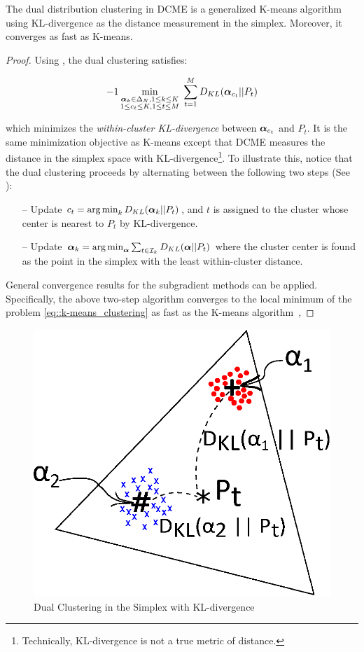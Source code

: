 \begin{thm}
  The dual distribution clustering in DCME is a generalized K-means
  algorithm using KL-divergence as the distance measurement in the simplex.
  Moreover, it converges as fast as K-means.
\end{thm}
\begin{proof}
  Using , the dual clustering satisfies:

  \begin{alignat}{-1}
    \min\limits_{\substack{\valpha_k\in \Delta_N ,  1 \le k \le K \\
                           1 \le c_t \le K , 1 \le t \le M}} \;
  \sum\limits_{t=1}^M D_{KL}(\valpha_{c_t} || P_t) \label{eq::k-means_clustering}
  \end{alignat}

  which minimizes the \emph{within-cluster KL-divergence} between
  $\boldsymbol{\alpha}_{c_t}$ and $P_t$. It is the same minimization objective as K-means
  except that DCME measures the distance in the simplex space with
  KL-divergence\footnote{Technically, KL-divergence is not a true metric of
  distance.}. To illustrate this, notice that the dual clustering proceeds by
  alternating between the following two steps (See ):

\begin{itemize}
\item[--] Update $c_t = \operatorname*{arg\,min}_{k} D_{KL}(\boldsymbol{\alpha}_k || P_t)$, and $t$ is
  assigned to the cluster whose center is nearest to $P_t$ by KL-divergence.
\item[--] Update $\boldsymbol{\alpha}_k = \operatorname*{arg\,min}_{\boldsymbol{\alpha}} \sum_{t \in \mathcal{I}_k} D_{KL}(
  \boldsymbol{\alpha} || P_t)$ where the cluster center is found as the point in the simplex
  with the least within-cluster distance.
\end{itemize}

General convergence results for the subgradient methods can be applied.
Specifically, the above two-step algorithm converges to the local minimum of the
problem \eqref{eq::k-means_clustering} as fast as the K-means
algorithm~\cite{bottou1995convergence},
\end{proof}

\begin{figure}[h!]
  \centering
  \includegraphics[width=0.4\linewidth]{dcme/dual_cluster_color.eps}
  \caption{Dual Clustering in the Simplex with KL-divergence}
  \label{fig::dual_cluster}
\end{figure}

